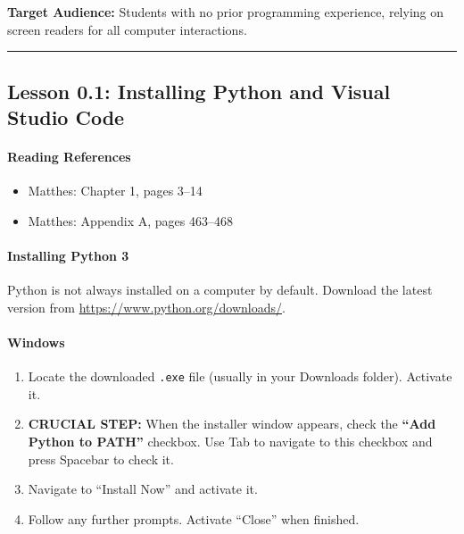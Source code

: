 \documentclass[
  justified,
  openright,
]{tufte-book}
\let\subsubsection\paragraph
\let\paragraph\paragraph
\let\subsubsection\paragraph
\let\paragraph\paragraph
\providecommand{\tightlist}{%
  \setlength{\itemsep}{0pt}\setlength{\parskip}{0pt}}
\begin{document}
\textbf{Target Audience:} Students with no prior programming experience,
relying on screen readers for all computer interactions.

\begin{center}\rule{0.5\linewidth}{0.5pt}\end{center}

\subsection{Lesson 0.1: Installing Python and Visual Studio
Code}\label{lesson-0.1-installing-python-and-visual-studio-code}

\subsubsection{Reading References}\label{reading-references}

\begin{itemize}
\tightlist
\item
  Matthes: Chapter 1, pages 3--14
\item
  Matthes: Appendix A, pages 463--468
\end{itemize}

\subsubsection{Installing Python 3}\label{installing-python-3}

Python is not always installed on a computer by default. Download the
latest version from \url{https://www.python.org/downloads/}.

\paragraph{Windows}\label{windows}

\begin{enumerate}
\def\labelenumi{\arabic{enumi}.}
\tightlist
\item
  Locate the downloaded \texttt{.exe} file (usually in your Downloads
  folder). Activate it.
\item
  \textbf{CRUCIAL STEP:} When the installer window appears, check the
  \textbf{``Add Python to PATH''} checkbox. Use Tab to navigate to this
  checkbox and press Spacebar to check it.
\item
  Navigate to ``Install Now'' and activate it.
\item
  Follow any further prompts. Activate ``Close'' when finished.
\end{enumerate}
\end{document}

